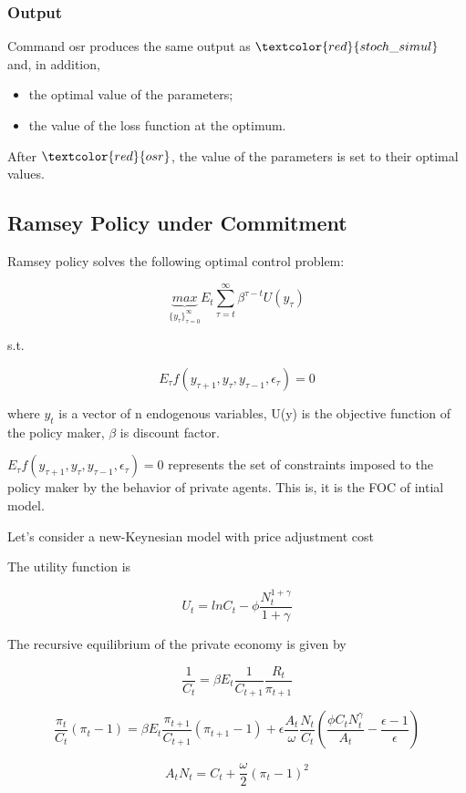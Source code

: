 \documentclass[10pt,math=newtx,citestyle=gb7714-2015,bibstyle=gb7714-2015]{elegantbook}
\begin{document}
{	\subsubsection{Output}
	
	Command osr produces the same output as $\textcolor{red}{stoch\_simul}$ and, in addition,
	\begin{itemize}
		\item the optimal value of the parameters;
		\item the value of the loss function at the optimum.
	\end{itemize}
	After $\textcolor{red}{osr}$, the value of the parameters is set to their optimal values.
	
	\subsection{Ramsey Policy under Commitment}
	
	Ramsey policy solves the following optimal control problem:
	
	$$\underbrace{max}_{\{y_{\tau}\}_{\tau=0}^{\infty}}E_t\sum_{\tau=t}^{\infty}\beta^{\tau-t}U(y_{\tau})$$
	
	s.t.
	
	$$E_{\tau}f(y_{\tau+1},y_{\tau},y_{\tau-1},\epsilon_{\tau})=0$$
	
	where $y_t$ is a vector of n endogenous variables, U(y) is the objective function of the policy maker, $\beta$ is discount factor.
	
	$E_{\tau}f(y_{\tau+1},y_{\tau},y_{\tau-1},\epsilon_{\tau})=0$ represents the set of constraints imposed to the policy maker by the behavior of private agents. This is, it is the FOC of intial model.
	
	Let’s consider a new-Keynesian model with price adjustment cost
	
	The utility function is
	
	$$U_t=lnC_t-\phi\frac{N_t^{1+\gamma}}{1+\gamma}$$
	
	The recursive equilibrium of the private economy is given by
	
	$$\frac{1}{C_t}=\beta E_t\frac{1}{C_{t+1}}\frac{R_t}{\pi_{t+1}}$$
	
	$$\frac{\pi_t}{C_t}(\pi_t-1)=\beta E_t\frac{\pi_{t+1}}{C_{t+1}}(\pi_{t+1}-1)+\epsilon\frac{A_t}{\omega}\frac{N_t}{C_t}\left(\frac{\phi C_tN_t^{\gamma}}{A_t}-\frac{\epsilon-1}{\epsilon}\right)$$
	
	$$A_tN_t=C_t+\frac{\omega}{2}(\pi_t-1)^2$$
	
}
\end{document}
